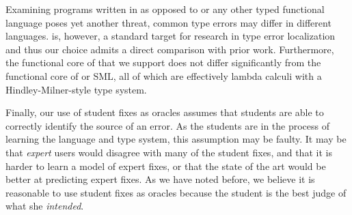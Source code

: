 Examining programs written in \ocaml as opposed to \haskell or any other
typed functional language poses yet another threat, common type errors
may differ in different languages.
%
\ocaml is, however, a standard target for research in type error
localization and thus our choice admits a direct comparison with prior
work.
%
Furthermore, the functional core of \ocaml that we support does not
differ significantly from the functional core of \haskell or SML, all of
which are effectively lambda calculi with a Hindley-Milner-style type
system.

Finally, our use of student fixes as oracles
assumes that students are able to correctly identify
the source of an error.
%
As the students are in the process of learning the language and type
system, this assumption may be faulty.
%
It may be that \emph{expert} users would disagree with many of the
student fixes, and that it is harder to learn a model of expert fixes,
or that the state of the art would be better at predicting expert fixes.
%
As we have noted before, we believe it is reasonable to use student
fixes as oracles because the student is the best judge of what she
\emph{intended}.
